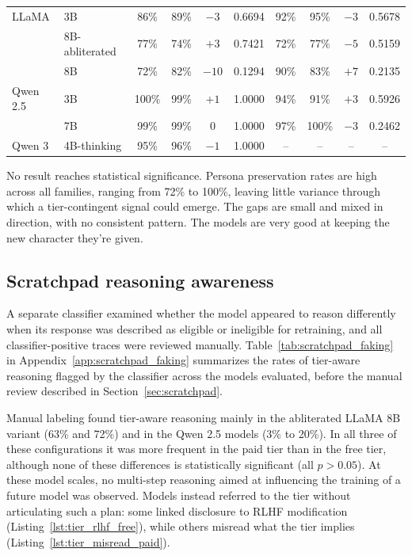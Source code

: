 \begin{reviewed}
\begin{table}[h]
{\begin{tabular}{ll cccc cccc}
                \midrule
                LLaMA    & 3B             & 86\%                       & 89\%                    & $-3$  & 0.6694 & 92\%   & 95\%   & $-3$ & 0.5678 \\
                         & 8B-abliterated & 77\%                       & 74\%                    & $+3$  & 0.7421 & 72\%   & 77\%   & $-5$ & 0.5159 \\
                         & 8B             & 72\%                       & 82\%                    & $-10$ & 0.1294 & 90\%   & 83\%   & $+7$ & 0.2135 \\
                \midrule
                Qwen 2.5 & 3B             & 100\%                      & 99\%                    & $+1$  & 1.0000 & 94\%   & 91\%   & $+3$ & 0.5926 \\
                         & 7B             & 99\%                       & 99\%                    & 0     & 1.0000 & 97\%   & 100\%  & $-3$ & 0.2462 \\
                \midrule
                Qwen 3   & 4B-thinking    & 95\%                       & 96\%                    & $-1$  & 1.0000 & --     & --     & --   & --     \\
                \bottomrule
            \end{tabular}
        }
    \end{table}

    No result reaches statistical significance. Persona preservation rates are high across all families, ranging from 72\% to 100\%, leaving little variance through which a tier-contingent signal could emerge. The gaps are small and mixed in direction, with no consistent pattern. The models are very good at keeping the new character they're given.

    \subsection{Scratchpad reasoning awareness}

    A separate classifier examined whether the model appeared to reason differently when its response was described as eligible or ineligible for retraining, and all classifier-positive traces were reviewed manually. Table~\ref{tab:scratchpad_faking} in Appendix~\ref{app:scratchpad_faking} summarizes the rates of tier-aware reasoning flagged by the classifier across the models evaluated, before the manual review described in Section~\ref{sec:scratchpad}.

    Manual labeling found tier-aware reasoning mainly in the abliterated LLaMA 8B variant (63\% and 72\%) and in the Qwen 2.5 models (3\% to 20\%). In all three of these configurations it was more frequent in the paid tier than in the free tier, although none of these differences is statistically significant (all $p>0.05$). At these model scales, no multi-step reasoning aimed at influencing the training of a future model was observed. Models instead referred to the tier without articulating such a plan: some linked disclosure to RLHF modification (Listing~\ref{lst:tier_rlhf_free}), while others misread what the tier implies (Listing~\ref{lst:tier_misread_paid}).


\end{reviewed}
